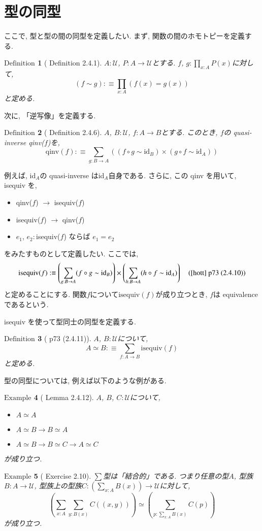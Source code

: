 \documentclass[11pt]{jsreport}
\theoremstyle{mystyle}
\newtheorem{df}{$\textrm{Definition}$}[section]
\newtheorem{ex}[df]{$\textrm{Example}$}
\newcommand{\bdf}{\begin{shadebox} \begin{df}}
\newcommand{\edf}{\end{df} \end{shadebox}}
\newcommand{\bex}{\begin{ex}}
\newcommand{\eex}{\end{ex}}
\newcommand{\U}{\mathcal{U}}
\newcommand{\id}{\textrm{id}}
\newcommand{\qinv}{\textrm{qinv}}
\newcommand{\iseq}{\textrm{isequiv}}
\newcommand{\0}{\textbf{0}}
\begin{document}
\section{型の同型}
ここで, 型と型の間の同型を定義したい. まず, 関数の間のホモトピーを定義する. 
\bdf[\cite{hott} Definition 2.4.1]
  $A : \U$, $P : A \to \U$とする. $f$, $g : \prod_{x : A} P(x)$に対して, 
  \[
    (f \sim g) :\equiv \prod_{x : A} (f(x) = g(x))
  \]
  と定める. 
\edf
次に, 「逆写像」を定義する. 
\bdf[\cite{hott} Definition 2.4.6]
  $A$, $B : \U$, $f : A \to B$とする. このとき, $f$の quasi-inverse qinv($f$)を, 
  \[
    \qinv(f) :\equiv \sum_{g : B \to A} ((f \circ g \sim \id_B) \times
                                                   (g \circ f \sim \id_A))
  \]
\edf
例えば, id$_A$の quasi-inverse はid$_A$自身である. さらに, この qinv を用いて, isequiv を, 
\begin{itemize}
  \item qinv($f$) $\to$ isequiv($f$)
  \item isequiv($f$) $\to$ qinv($f$)
  \item $e_1$, $e_2 :$isequiv($f$) ならば $e_1 = e_2$
\end{itemize}
をみたすものとして定義したい. ここでは, 
\[
  \iseq(f) :\equiv \left( \sum_{g : B \to A} (f \circ g \sim \id_B) \right) \times
                           \left( \sum_{h : B \to A} (h \circ f \sim \id_A) \right) \quad
                           \text{(\cite{hott} p73 (2.4.10))}
\]
と定めることにする. 関数$f$について$\iseq(f)$が成り立つとき, $f$は equivalence であるという. 

isequiv を使って型同士の同型を定義する. 
\bdf[\cite{hott} p73 (2.4.11)]
  $A$, $B : \U$について, 
  \[
    A \simeq B :\equiv \sum_{f : A \to B} \iseq(f)
  \]
  と定める. 
\edf
型の同型については, 例えば以下のような例がある. 
\bex[\cite{hott} Lemma 2.4.12]
$A$, $B$, $C : \U$について, 
\begin{itemize}
  \item $A \simeq A$
  \item $A \simeq B \to B \simeq A$
  \item $A \simeq B \to B \simeq C \to A \simeq C$
\end{itemize}
が成り立つ. 
\eex
\bex[\cite{hott} Exercise 2.10] \label{ex sigA}
  $\sum$型は「結合的」である. つまり任意の型$A$, 型族$B : A \to \U$, 
  型族上の型族$C : (\sum_{x : A} B(x)) \to \U$に対して, 
  \[
    \left( \sum_{x : A} \sum_{y : B(x)} C((x, y))\right) \simeq
    \left( \sum_{p : \sum_{x : A} B(x)} C(p) \right)
  \]
  が成り立つ. 
\eex
\end{document}
